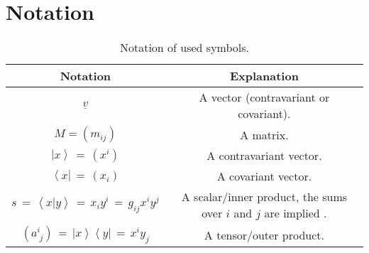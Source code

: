 %
%

\chapter{Notation}

\begin{table}[htb]
	\centering
	\begin{tabular}{|c|c|}
		\hline
		\bf{Notation} & \bf{Explanation} \tabularnewline
		\hline
		$ \underline{v} $ & A vector (contravariant or covariant). \tabularnewline
		\hline
		$ M = \left( m_{ij} \right) $ & A matrix. \tabularnewline
		\hline
		$\left| x \right> \,=\, \left( x^i \right) $ & A contravariant vector. \tabularnewline
		\hline
		$\left< x \right| \,=\, \left( x_i \right) $ & A covariant vector. \tabularnewline
		\hline
		$s \,=\, \left< x | y \right> \,=\, x_i y^i \,=\, g_{ij} x^i y^j $ & A scalar/inner product, the sums over $i$ and $j$ are implied \cite{wiki_summation}. \tabularnewline
		\hline
		$\left(a^{i}_{\;j}\right) \,=\, \left| x \right> \left< y \right| \,=\, x^i y_j$ & A tensor/outer product. \tabularnewline
		\hline
	\end{tabular}
	\caption[Symbol notation]{Notation of used symbols.}
	\label{tab:notation}
\end{table}
